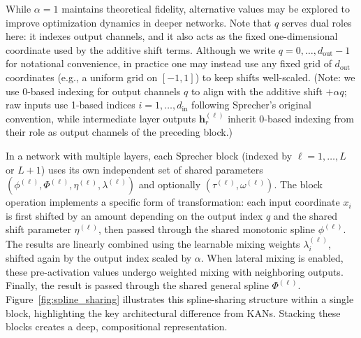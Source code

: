 \documentclass{article}
\theoremstyle{plain}
\theoremstyle{definition}
\theoremstyle{remark}
\begin{document}
While $\alpha = 1$ maintains theoretical fidelity, alternative values may be explored to improve optimization dynamics in deeper networks. Note that $q$ serves dual roles here: it indexes output channels, and it also acts as the fixed one-dimensional coordinate used by the additive shift terms. Although we write $q = 0, \ldots, d_{\mathrm{out}}-1$ for notational convenience, in practice one may instead use any fixed grid of $d_{\mathrm{out}}$ coordinates (e.g., a uniform grid on $[-1,1]$) to keep shifts well-scaled. (Note: we use 0-based indexing for output channels $q$ to align with the additive shift $+\alpha q$; raw inputs use 1-based indices $i=1,\ldots,d_{\mathrm{in}}$ following Sprecher's original convention, while intermediate layer outputs $\mathbf{h}^{(\ell)}_r$ inherit 0-based indexing from their role as output channels of the preceding block.)

In a network with multiple layers, each Sprecher block (indexed by $\ell=1, \dots, L$ or $L+1$) uses its own independent set of shared parameters $(\phi^{(\ell)}, \Phi^{(\ell)}, \eta^{(\ell)}, \lambda^{(\ell)})$ and optionally $(\tau^{(\ell)}, \omega^{(\ell)})$. The block operation implements a specific form of transformation: each input coordinate $x_i$ is first shifted by an amount depending on the output index $q$ and the shared shift parameter $\eta^{(\ell)}$, then passed through the shared monotonic spline $\phi^{(\ell)}$. The results are linearly combined using the learnable mixing weights $\lambda^{(\ell)}_{i}$, shifted again by the output index scaled by $\alpha$. When lateral mixing is enabled, these pre-activation values undergo weighted mixing with neighboring outputs. Finally, the result is passed through the shared general spline $\Phi^{(\ell)}$. Figure~\ref{fig:spline_sharing} illustrates this spline-sharing structure within a single block, highlighting the key architectural difference from KANs. Stacking these blocks creates a deep, compositional representation.
\end{document}
